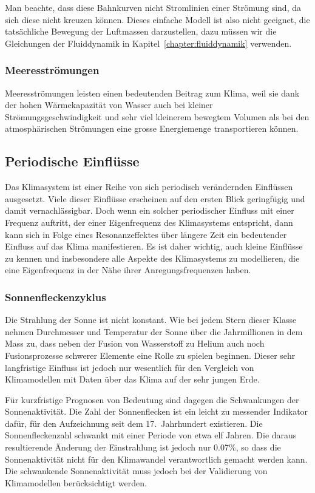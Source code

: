 Man beachte, dass diese Bahnkurven nicht Stromlinien einer Strömung sind,
da sich diese nicht kreuzen können.
Dieses einfache Modell ist also nicht geeignet, die tatsächliche Bewegung
der Luftmassen darzustellen, dazu müssen wir die Gleichungen
der Fluiddynamik in Kapitel~\ref{chapter:fluiddynamik} verwenden.

\subsubsection{Meeresströmungen}
Meeresströmungen leisten einen bedeutenden Beitrag zum Klima, weil sie
dank der hohen Wärmekapazität von Wasser auch bei kleiner
Strömungsgeschwindigkeit und sehr viel kleinerem bewegtem Volumen als
bei den atmosphärischen Strömungen eine grosse Energiemenge transportieren
können.

\subsection{Periodische Einflüsse}
Das Klimasystem ist einer Reihe von sich periodisch verändernden 
Einflüssen ausgesetzt.
Viele dieser Einflüsse erscheinen auf den ersten Blick geringfügig
und damit vernachlässigbar.
Doch wenn ein solcher periodischer Einfluss mit einer Frequenz auftritt,
der einer Eigenfrequenz des Klimasystems entspricht, dann kann sich 
in Folge eines Resonanzeffektes über längere Zeit ein bedeutender 
Einfluss auf das Klima manifestieren.
Es ist daher wichtig, auch kleine Einflüsse zu kennen und insbesondere
alle Aspekte des Klimasystems zu modellieren, die eine Eigenfrequenz
in der Nähe ihrer Anregungsfrequenzen haben.

\subsubsection{Sonnenfleckenzyklus}
%
%
Die Strahlung der Sonne ist nicht konstant.
Wie bei jedem Stern dieser Klasse nehmen Durchmesser und Temperatur der
Sonne über die Jahrmillionen in dem Mass zu, dass neben der Fusion
von Wasserstoff zu Helium auch noch Fusionsprozesse schwerer Elemente
eine Rolle zu spielen beginnen.
Dieser sehr langfristige Einfluss ist jedoch nur wesentlich für
den Vergleich von Klimamodellen mit Daten über das Klima auf der sehr
jungen Erde.

Für kurzfristige Prognosen von Bedeutung sind dagegen die Schwankungen
der Sonnenaktivität.
%
Die Zahl der Sonnenflecken ist ein leicht zu messender Indikator
dafür, für den Aufzeichnung seit dem 17.~Jahrhundert existieren.
Die Sonnenfleckenzahl schwankt mit einer Periode von etwa elf Jahren.
Die daraus resultierende Änderung der Einstrahlung ist jedoch nur 0.07\%,
so dass die Sonnenaktivität nicht für den Klimawandel verantwortlich
gemacht werden kann. 
Die schwankende Sonnenaktivität muss jedoch bei der Validierung
von Klimamodellen berücksichtigt werden.

